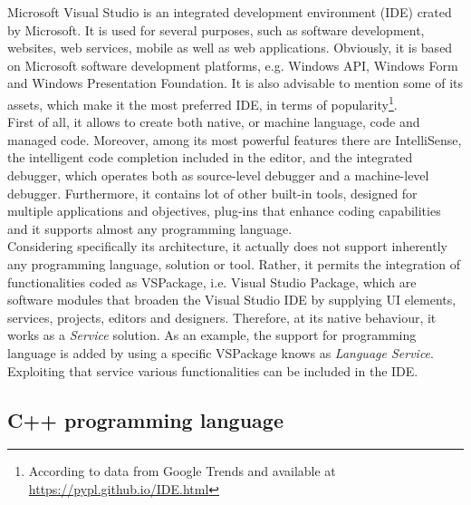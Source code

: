 Microsoft Visual Studio is an integrated development environment (IDE) crated by Microsoft. 
It is used for several purposes, such as software development, websites, web services, mobile as well as web applications. 
Obviously, it is based on Microsoft software development platforms, e.g. Windows API, Windows Form and Windows Presentation Foundation. 
It is also advisable to mention some of its assets, which make it the most preferred IDE, in terms of popularity\footnote{According to data from Google Trends and available at \url{https://pypl.github.io/IDE.html}}. \\
First of all, it allows to create both native, or machine language, code and managed code.
Moreover, among its most powerful features there are IntelliSense, the intelligent code completion included in the editor, and the integrated debugger, which operates both as source-level debugger and a machine-level debugger. 
Furthermore, it contains lot of other built-in tools, designed for multiple applications and objectives, plug-ins that enhance coding capabilities and it supports almost any programming language.\\
Considering specifically its architecture, it actually does not support inherently any programming language, solution or tool.
Rather, it permits the integration of functionalities coded as VSPackage, i.e. Visual Studio Package, which are software modules that broaden the Visual Studio IDE by supplying UI elements, services, projects, editors and designers. 
Therefore, at its native behaviour, it works as a \textit{Service} solution. 
As an example, the support for programming language is added by using a specific VSPackage knows as \textit{Language Service}.
Exploiting that service various functionalities can be included in the IDE. 

\subsection{C++ programming language}
\label{subsection:c++-env}

